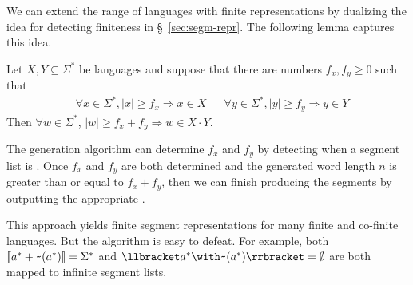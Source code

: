 We can extend the range of languages with
finite representations by dualizing the idea for
detecting finiteness in \S~\ref{sec:segm-repr}. The following
lemma captures this idea.
\begin{lemma}
Let $X, Y \subseteq \Sigma^*$ be languages and 
suppose that there are numbers $f_x, f_y\ge0$ such that
\begin{align*}
  & \forall x \in \Sigma^*,  |x| \ge f_x \Rightarrow x \in X
  && \forall y \in \Sigma^*, |y| \ge f_y \Rightarrow y \in Y
\end{align*}
Then $\forall w \in \Sigma^*$, $|w|\ge f_x+f_y \Rightarrow w \in X\cdot Y$.
\end{lemma}
The generation algorithm can determine $f_x$
and $f_y$ by detecting when a segment list is . Once $f_x$
and $f_y$ are both determined and the generated word length $n$ is
greater than or equal to $f_x+f_y$, then we can finish producing the segments by
outputting the appropriate .

This approach yields finite segment representations
for many finite and co-finite languages. %
But the algorithm is easy to defeat. For example, both
$\llbracket a^* + \texttt{\textasciitilde}{(a^*)}\rrbracket = \Sigma^*$ and
$\Lang{\Rintersect{\Rstar a} \Rcomplement{(\Rstar a)}} = \emptyset$
are both mapped to infinite segment lists.

